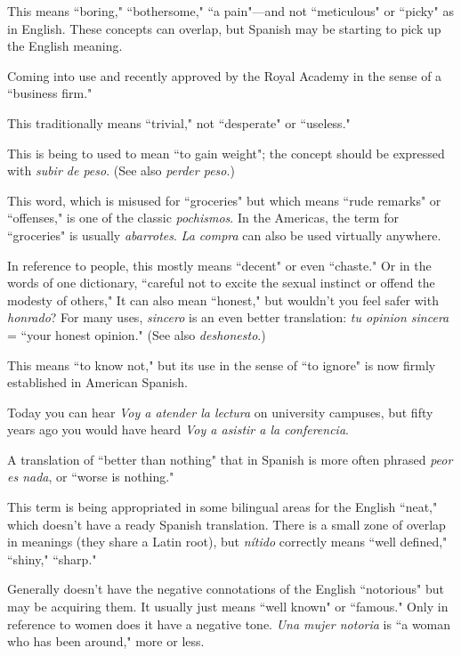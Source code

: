  This means ``boring," ``bothersome," ``a pain"---and not ``meticulous" or ``picky" as in English. These concepts can
overlap, but Spanish may be starting to pick up the English meaning.

 Coming into use and recently approved by the Royal
Academy in the sense of a ``business firm."

 This traditionally means ``trivial," not ``desperate" or
``useless."

 This is being to used to mean ``to gain
weight"; the concept should be expressed with \emph{subir de peso}. (See
also \emph{perder peso}.)

 This word, which is misused for ``groceries" but
which means ``rude remarks" or ``offenses," is one of the classic \emph{pochismos}. In the Americas, the term for ``groceries" is usually \emph{abarrotes}. \emph{La compra} can also be used virtually anywhere.

 In reference to people, this mostly means ``decent"
or even ``chaste." Or in the words of one dictionary, ``careful not to excite the sexual instinct or offend the modesty of others," It can also
mean ``honest," but wouldn't you feel safer with \emph{honrado}? For many
uses, \emph{sincero} is an even better translation: \emph{tu opinion sincera} = ``your
honest opinion." (See also \emph{deshonesto}.)

 This means ``to know not," but its use in the sense
of ``to ignore" is now firmly established in American Spanish.

 Today you can hear \emph{Voy a atender la lectura} on
university campuses, but fifty years ago you would have heard \emph{Voy a
	asistir a la conferencia}.

 A translation of ``better than nothing"
that in Spanish is more often phrased \emph{peor es nada}, or ``worse is
nothing."

 This term is being appropriated in some bilingual
areas for the English ``neat," which doesn't have a ready Spanish translation. There is a small zone of overlap in meanings (they share a Latin
root), but \emph{nítido} correctly means ``well defined," ``shiny," ``sharp."

 Generally doesn't have the negative connotations
of the English ``notorious" but may be acquiring them. It usually just
means ``well known" or ``famous." Only in reference to women does it
have a negative tone. \emph{Una mujer notoria} is ``a woman who has been
around," more or less.

